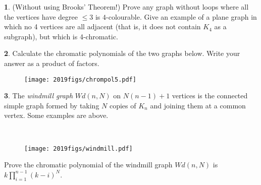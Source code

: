 \documentclass[12pt]{article}
\theoremstyle{definition}
\newtheorem{problem}{}
\begin{document}
\begin{problem}
(Without using Brooks' Theorem!) Prove any graph without loops where all the vertices have degree $\leq 3$ is $4$-colourable. Give an example of a plane graph in which no 4 vertices are all adjacent (that is, it does not contain $K_4$ as a subgraph), but which is 4-chromatic.
\end{problem}

\begin{problem}
Calculate the chromatic polynomials of the two graphs below. Write your answer as a product of factors.

\begin{figure}[h]\centerline{\texttt{[image: 2019figs/chrompol5.pdf]}}
\end{figure}
\end{problem}

\begin{problem}
The \emph{windmill graph} $Wd(n,N)$ on $N(n-1) + 1$ vertices is the connected simple graph formed by taking $N$ copies of $K_n$ and joining them at a common vertex. Some examples are above.

\

\begin{figure}[!h]\centerline{\texttt{[image: 2019figs/windmill.pdf]}}
\end{figure}


Prove the chromatic polynomial of the windmill graph $Wd(n, N)$ is $k\prod _{i=1} ^{n-1} (k-i)^N$.
\end{problem} 
\end{document}
